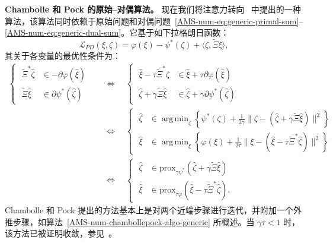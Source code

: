 \documentclass{amsproc}
\theoremstyle{definition}
\theoremstyle{remark}
\numberwithin{equation}{section}
\newcommand{\cL}{{\mathcal L}}
\DeclareMathOperator*{\argmin}{arg\,min}
\newcommand{\prox}{\mathrm{prox}}
\begin{document}
\textbf{Chambolle 和 Pock 的原始--对偶算法。} 现在我们将注意力转向~\cite{MR2782122} 中提出的一种算法，该算法同时依赖于原始问题和对偶问题~\eqref{AMS-num-eq:generic-primal-sum}--\eqref{AMS-num-eq:generic-dual-sum}。它基于如下拉格朗日函数：
\begin{equation}
\label{AMS-num-eq:generic-LagSaddlePoint-PD}
	\cL_{PD} (\xi, \zeta) = \varphi(\xi) - \psi^*(\zeta) + \langle \zeta, \widetilde{\Xi} \xi \rangle,
\end{equation}
其关于各变量的最优性条件为：
\begin{align*}
	\begin{cases}
	\,\, \widetilde{\Xi}^*\hat\zeta &\in -\partial \varphi(\hat\xi) 
	\\
	\,\,  \widetilde{\Xi}\hat\xi &\in \partial \psi^*(\hat \zeta)
	\end{cases}
	&\quad
	\Leftrightarrow
	\quad
	\begin{cases}
	\,\, \hat\xi - \tau \widetilde{\Xi}^*\hat\zeta &\in \hat\xi + \tau \partial \varphi(\hat\xi) 
	\\
	\,\, \hat\zeta + \gamma \widetilde{\Xi}\hat\xi &\in \hat\zeta + \gamma \partial \psi^*(\hat \zeta)
	\end{cases}
	\\
	&\quad
	\Leftrightarrow
	\quad
	\begin{cases}
	\,\, \hat \zeta &\in \argmin_\zeta \left\{ \psi^*(\zeta) + \frac{1}{2 \gamma}\| \zeta - (\hat \zeta + \gamma \widetilde{\Xi} \hat \xi )\|^2 \right\}
	\\
	\,\, \hat \xi &\in \argmin_\xi \left\{ \varphi(\xi) + \frac{1}{2 \tau} \| \xi - (\hat \xi - \tau \widetilde{\Xi}^* \hat \zeta) \|^2 \right\}
	\end{cases}
	\\
	&\quad
	\Leftrightarrow
	\quad
	\begin{cases}
	\,\, \hat \zeta &\in \prox_{\gamma \psi^*} (\hat \zeta + \gamma \widetilde{\Xi} \hat \xi ) 
	\\
	\,\, \hat \xi &\in \prox_{\tau \varphi} (\hat \xi - \tau \widetilde{\Xi}^* \hat \zeta).
	\end{cases}
\end{align*}
Chambolle 和 Pock 提出的方法基本上是对两个近端步骤进行迭代，并附加一个外推步骤，如算法~\ref{AMS-num-chambollepock-algo-generic} 所概述。当 $\gamma \tau < 1$ 时，该方法已被证明收敛，参见~\cite{MR2782122}。
\end{document}
